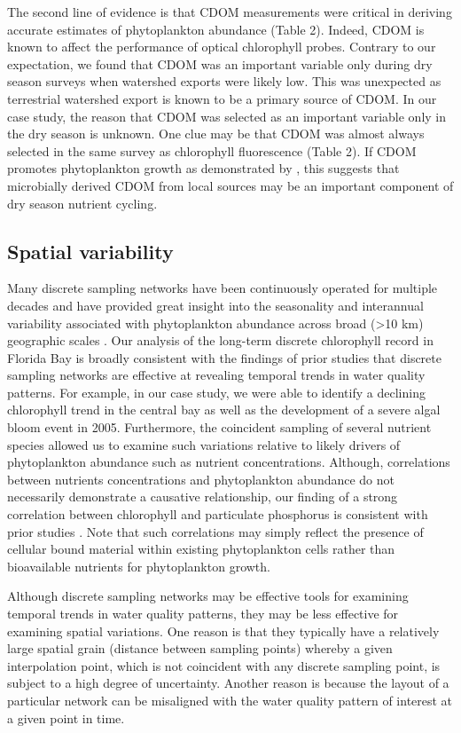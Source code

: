 \documentclass[review]{elsarticle}
\begin{document}
The second line of evidence is that CDOM measurements were critical in deriving accurate estimates of phytoplankton abundance (Table 2). Indeed, CDOM is known to affect the performance of optical chlorophyll probes. Contrary to our expectation, we found that CDOM was an important variable only during dry season surveys when watershed exports were likely low. This was unexpected as terrestrial watershed export is known to be a primary source of CDOM. In our case study, the reason that CDOM was selected as an important variable only in the dry season is unknown. One clue may be that CDOM was almost always selected in the same survey as chlorophyll fluorescence (Table 2). If CDOM promotes phytoplankton growth as demonstrated by \citet{traving2017effect}, this suggests that microbially derived CDOM from local sources may be an important component of dry season nutrient cycling.

\subsection{Spatial variability}

Many discrete sampling networks have been continuously operated for multiple decades and have provided great insight into the seasonality and interannual variability associated with phytoplankton abundance across broad (>10 km) geographic scales \citep{cloern_patterns_2010}. Our analysis of the long-term discrete chlorophyll record in Florida Bay is broadly consistent with the findings of prior studies that discrete sampling networks are effective at revealing temporal trends in water quality patterns. For example, in our case study, we were able to identify a declining chlorophyll trend in the central bay as well as the development of a severe algal bloom event in 2005. Furthermore, the coincident sampling of several nutrient species allowed us to examine such variations relative to likely drivers of phytoplankton abundance such as nutrient concentrations. Although, correlations between nutrients concentrations and phytoplankton abundance do not necessarily demonstrate a causative relationship, our finding of a strong correlation between chlorophyll and particulate phosphorus is consistent with prior studies \citep[Table 1;][]{fourqurean1993process}. Note that such correlations may simply reflect the presence of cellular bound material within existing phytoplankton cells rather than bioavailable nutrients for phytoplankton growth. 

Although discrete sampling networks may be effective tools for examining temporal trends in water quality patterns, they may be less effective for examining spatial variations. One reason is that they typically have a relatively large spatial grain (distance between sampling points) whereby a given interpolation point, which is not coincident with any discrete sampling point, is subject to a high degree of uncertainty. Another reason is because the layout of a particular network can be misaligned with the water quality pattern of interest at a given point in time. 
\end{document}

